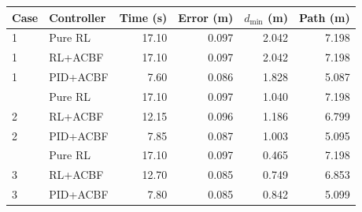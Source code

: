 \begin{tabular}{llrrrr}
\toprule
Case & Controller & Time (s) & Error (m) & $d_{\min}$ (m) & Path (m)\\
\midrule
1 & Pure RL & 17.10 & 0.097 & 2.042 & 7.198 \\
1 & RL+ACBF & 17.10 & 0.097 & 2.042 & 7.198 \\
1 & PID+ACBF & 7.60 & 0.086 & 1.828 & 5.087 \\
\addlinespace
2 & Pure RL & 17.10 & 0.097 & 1.040 & 7.198 \\
2 & RL+ACBF & 12.15 & 0.096 & 1.186 & 6.799 \\
2 & PID+ACBF & 7.85 & 0.087 & 1.003 & 5.095 \\
\addlinespace
3 & Pure RL & 17.10 & 0.097 & 0.465 & 7.198 \\
3 & RL+ACBF & 12.70 & 0.085 & 0.749 & 6.853 \\
3 & PID+ACBF & 7.80 & 0.085 & 0.842 & 5.099 \\
\bottomrule
\end{tabular}